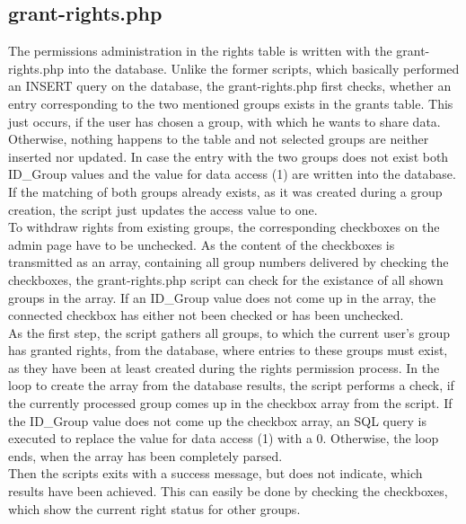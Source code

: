 \subsection{grant-rights.php}
The permissions administration in the rights table is written with the grant-rights.php into the database. Unlike the former scripts, which basically performed an INSERT query on 
the database, the grant-rights.php first checks, whether an entry corresponding to the two mentioned groups exists in the grants table. This just occurs, if the user has chosen 
a group, with which he wants to share data. Otherwise, nothing happens to the table and not selected groups are neither inserted nor updated. In case the entry with the two groups 
does not exist both ID\_Group values and the value for data access (1) are written into the database.\\
If the matching of both groups already exists, as it was created during a group creation, the script just updates the access value to one.\\
To withdraw rights from existing groups, the corresponding checkboxes on the admin page have to be unchecked. As the content of the checkboxes is transmitted as an array, containing all group numbers delivered by checking the checkboxes, the grant-rights.php script can check for the existance of all shown groups in the array. If an ID\_Group value does not come up in the array, the connected checkbox has either not been checked or has been unchecked.\\
As the first step, the script gathers all groups, to which the current user's group has granted rights, from the database, where entries to these groups must exist, as they have been at least created during the rights permission process. In the loop to create the array from the database results, the script performs a check, if the currently processed group comes up in the checkbox array from the script. If the ID\_Group value does not come up the checkbox array, an SQL query is executed to replace the value for data access (1) with a 0. Otherwise, the loop ends, when the array has been completely parsed.\\ 
 Then the scripts exits with a success message, but does not indicate, which results have been achieved. This can easily be done by checking the checkboxes, which show the current right status for other groups.

